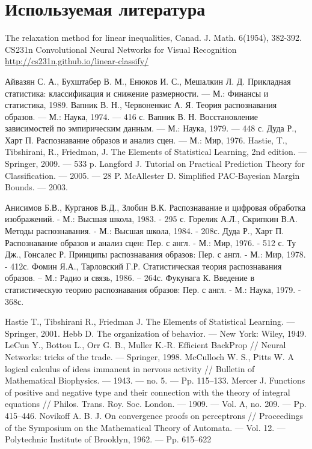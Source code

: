 \documentclass[a4paper]{article}
\begin{document}
\section{Используемая литература}
\begin{thebibliography}{99}
 The relaxation method for linear inequalities, Canad. J. Math. 6(1954), 382-392.
 CS231n Convolutional Neural Networks for Visual Recognition \url{http://cs231n.github.io/linear-classify/}

 Айвазян С. А., Бухштабер В. М., Енюков И. С., Мешалкин Л. Д. Прикладная статистика: классификация и снижение размерности. — М.: Финансы и статистика, 1989.
 Вапник В. Н., Червоненкис А. Я. Теория распознавания образов. — М.: Наука, 1974. — 416 с.  
 Вапник В. Н. Восстановление зависимостей по эмпирическим данным. — М.: Наука, 1979. — 448 с.  
 Дуда Р., Харт П. Распознавание образов и анализ сцен. — М.: Мир, 1976.
 Hastie, T., Tibshirani, R., Friedman, J. The Elements of Statistical Learning, 2nd edition. — Springer, 2009. — 533 p.  
 Langford J. Tutorial on Practical Prediction Theory for Classification. — 2005. — 28 P.
 McAllester D. Simplified PAC-Bayesian Margin Bounds. — 2003.

 Анисимов Б.В., Курганов В.Д., Злобин В.К. Распознавание и цифровая обработка
изображений. - М.: Высшая школа, 1983. - 295 с.
 Горелик А.Л., Скрипкин В.А. Методы распознавания. - М.: Высшая школа, 1984. -
208с.
 Дуда Р., Харт П. Распознавание образов и анализ сцен: Пер. с англ. - М.: Мир,
1976. - 512 с.
 Ту Дж., Гонсалес Р. Принципы распознавания образов: Пер. с англ. - М.: Мир,
1978. - 412с.
 Фомин Я.А., Тарловский Г.Р. Статистическая теория распознавания образов. – М.:
Радио и связь, 1986. – 264с.
 Фукунага К. Введение в статистическую теорию распознавания образов: Пер. с
англ. - М.: Наука, 1979. - 368с. 

Hastie T., Tibshirani R., Friedman J. The Elements of Statistical Learning. —
Springer, 2001.
 Hebb D. The organization of behavior. — New York: Wiley, 1949.
 LeCun Y., Bottou L., Orr G. B., Muller K.-R. Efficient BackProp // Neural
Networks: tricks of the trade. — Springer, 1998.
 McCulloch W. S., Pitts W. A logical calculus of ideas immanent in nervous activity //
Bulletin of Mathematical Biophysics. — 1943. — no. 5. — Pp. 115–133.
 Mercer J. Functions of positive and negative type and their connection with the
theory of integral equations // Philos. Trans. Roy. Soc. London. — 1909. — Vol. A,
no. 209. — Pp. 415–446.
 Novikoff A. B. J. On convergence proofs on perceptrons // Proceedings of the
Symposium on the Mathematical Theory of Automata. — Vol. 12. — Polytechnic
Institute of Brooklyn, 1962. — Pp. 615–622

\end{thebibliography}
\end{document}
